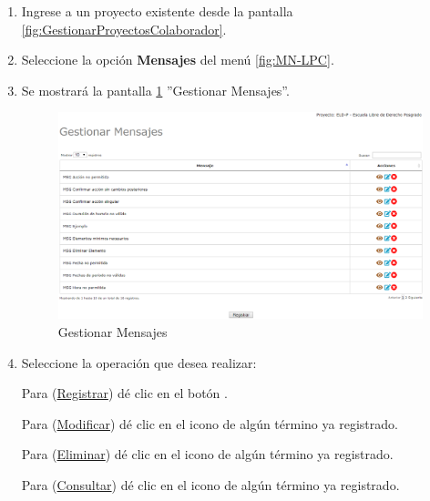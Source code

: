 			\begin{enumerate}
				
			\item Ingrese a un proyecto existente desde la pantalla \ref{fig:GestionarProyectosColaborador}.
	
			\item Seleccione la opción \textbf{Mensajes} del menú \ref{fig:MN-LPC}.
	
			\item Se mostrará la pantalla \ref{fig:GestionarMensajes} ''Gestionar Mensajes''.

			\begin{figure}[h!]
				\begin{center}
					\includegraphics[scale=0.6]{roles/lider/mensajes/pantallas/IU9gestionarMensajes}
					\caption{Gestionar Mensajes}
					\label{fig:GestionarMensajes}
				\end{center}
			\end{figure}
		
				\item Seleccione la operación que desea realizar:
			
			Para (\hyperlink{cv:registrarTermino}{Registrar}) dé clic en el botón \IURegistrar.
			
			Para (\hyperlink{cv:modificarTermino}{Modificar}) dé clic en el icono \IUEditar{} de algún término ya registrado.
			
			Para (\hyperlink{cv:eliminarProyecto}{Eliminar}) dé clic en el icono \IUBotonEliminar{} de algún término ya registrado.
			
			Para (\hyperlink{cv:consultarTermino}{Consultar}) dé clic en el icono \IUConsultar{} de algún término ya registrado.
			\end{enumerate}
